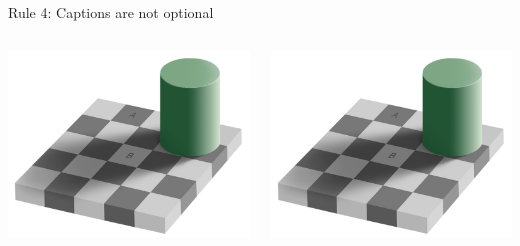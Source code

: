 \documentclass[10pt,aspectratio=169]{beamer}
\begin{document}
\begin{frame}{Rule 4: Captions are not optional}

  \begin{columns}
    \begin{column}{.45\textwidth}
        \begin{center}
          \includegraphics[width=.95\textwidth]{rule-4.png}
        \end{center}
    \end{column}
    \begin{column}{.45\textwidth}
        \begin{center}
          \includegraphics[width=.95\textwidth]{rule-4.png}

\end{center}
\end{column}
\end{columns}
\end{frame}
\end{document}
